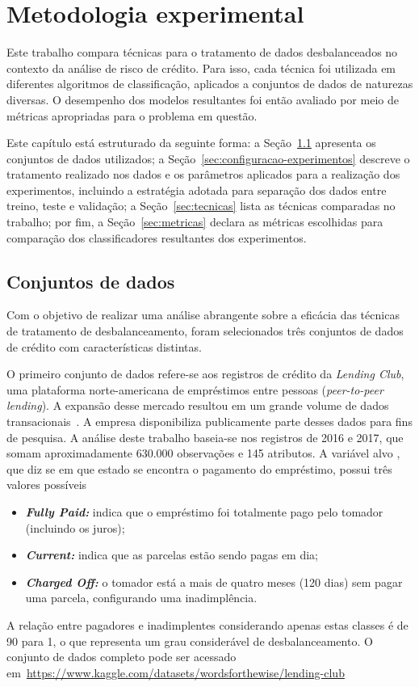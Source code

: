 \chapter{Metodologia experimental}\label{cap:ferramentas}

Este trabalho compara técnicas para o tratamento de dados desbalanceados no contexto da análise de risco de crédito. Para isso, cada técnica foi utilizada em diferentes algoritmos de classificação, aplicados a conjuntos de dados de naturezas diversas. O desempenho dos modelos resultantes foi então avaliado por meio de métricas apropriadas para o problema em questão.

Este capítulo está estruturado da seguinte forma: a Seção~\ref{sec:datasets} apresenta os conjuntos de dados utilizados; a Seção~\ref{sec:configuracao-experimentos} descreve o tratamento realizado nos dados e os parâmetros aplicados para a realização dos experimentos, incluindo a estratégia adotada para separação dos dados entre treino, teste e validação; a Seção~\ref{sec:tecnicas} lista as técnicas comparadas no trabalho; por fim, a Seção~\ref{sec:metricas} declara as métricas escolhidas para comparação dos classificadores resultantes dos experimentos.

\section{Conjuntos de dados}\label{sec:datasets}

Com o objetivo de realizar uma análise abrangente sobre a eficácia das técnicas de tratamento de desbalanceamento, foram selecionados três conjuntos de dados de crédito com características distintas.

O primeiro conjunto de dados refere-se aos registros de crédito da \textit{Lending Club}, uma plataforma norte-americana de empréstimos entre pessoas (\textit{peer-to-peer lending}). A expansão desse mercado resultou em um grande volume de dados transacionais~\cite{Namvar2018}. A empresa disponibiliza publicamente parte desses dados para fins de pesquisa. A análise deste trabalho baseia-se nos registros de 2016 e 2017, que somam aproximadamente \(630.000\) observações e 145 atributos. A variável alvo , que diz se em que estado se encontra o pagamento do empréstimo, possui três valores possíveis
\begin{itemize}
  \item \textbf{\textit{Fully Paid:}} indica que o empréstimo foi totalmente pago pelo tomador (incluindo os juros);
  \item \textbf{\textit{Current:}} indica que as parcelas estão sendo pagas em dia;
  \item \textbf{\textit{Charged Off:}} o tomador está a mais de quatro meses (120 dias) sem pagar uma parcela, configurando uma inadimplência.
\end{itemize}
A relação entre pagadores e inadimplentes considerando apenas estas classes é de 90 para 1, o que representa um grau considerável de desbalanceamento. O conjunto de dados completo pode ser acessado em~\url{https://www.kaggle.com/datasets/wordsforthewise/lending-club}

